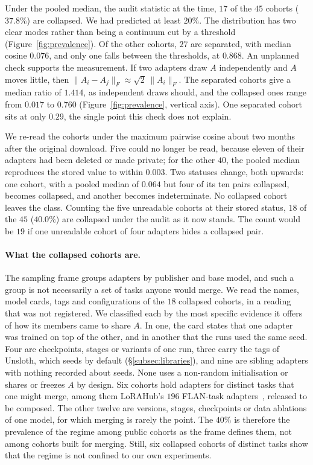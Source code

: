 Under the pooled median, the audit statistic at the time, $17$ of the $45$
cohorts ($37.8\%$) are collapsed. We had predicted at least $20\%$. The
distribution has two clear modes rather than being a continuum cut by a
threshold (Figure~\ref{fig:prevalence}). Of the other cohorts, $27$ are
separated, with median cosine $0.076$, and only one falls between the
thresholds, at $0.868$.
An unplanned check supports the measurement. If two adapters draw $A$
independently and $A$ moves little, then
$\|A_i - A_j\|_F \approx \sqrt2\,\|A_i\|_F$. The separated cohorts give a
median ratio of $1.414$, as independent draws should, and the collapsed
ones range from $0.017$ to $0.760$ (Figure~\ref{fig:prevalence}, vertical
axis). One separated cohort sits at only $0.29$, the single point this check
does not explain.

We re-read the cohorts under the maximum pairwise cosine about two months
after the original download. Five could no longer be read, because eleven of
their adapters had been deleted or made private; for the other $40$, the
pooled median reproduces the stored value to within $0.003$. Two statuses
change, both upwards: one cohort, with a pooled median of $0.064$ but four of
its ten pairs collapsed, becomes collapsed, and another becomes
indeterminate. No collapsed cohort leaves the class. Counting the five
unreadable cohorts at their stored status, $18$ of the $45$ ($40.0\%$) are
collapsed under the audit as it now stands. The count would be $19$ if one
unreadable cohort of four adapters hides a collapsed pair.

\paragraph{What the collapsed cohorts are.} The sampling frame groups adapters
by publisher and base model, and such a group is not necessarily a set of
tasks anyone would merge. We read the names, model cards, tags and
configurations of the $18$ collapsed cohorts, in a reading that was not
registered. We classified each by the most specific evidence it offers of how
its members came to share $A$. In one, the card states that one adapter was
trained on top of the other, and in another that the runs used the same seed.
Four are checkpoints, stages or variants of one run, three carry the tags of
Unsloth, which seeds by default (\S\ref{subsec:libraries}), and nine are
sibling adapters with nothing recorded about seeds. None uses a non-random initialisation or shares or
freezes $A$ by design. Six cohorts hold adapters for distinct tasks that one
might merge, among them LoRAHub's $196$ FLAN-task
adapters~\citep{huang2024lorahub}, released to be composed. The other twelve
are versions, stages, checkpoints or data ablations of one model, for which
merging is rarely the point. The $40\%$ is therefore the prevalence of the
regime among public cohorts as the frame defines them, not among cohorts
built for merging. Still, six collapsed cohorts of distinct tasks show that
the regime is not confined to our own experiments.

